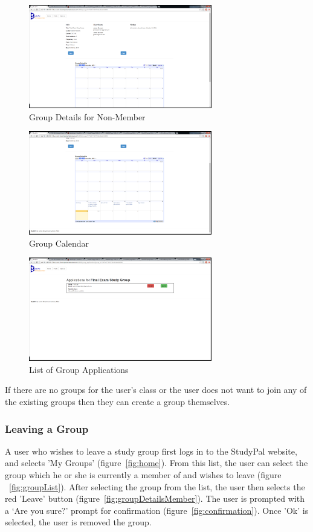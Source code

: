 \documentclass[conference]{IEEEtran}
\begin{document}
\begin{figure}[ht!]
\centering
\includegraphics[width=80mm]{figures/groupDetails}
\caption{Group Details for Non-Member \label{fig:groupDetails}}
\end{figure}

\begin{figure}[ht!]
\centering
\includegraphics[width=80mm]{figures/groupCalendar}
\caption{Group Calendar \label{fig:groupCalendar}}
\end{figure}

\begin{figure}[ht!]
\centering
\includegraphics[width=80mm]{figures/groupApplicationList}
\caption{List of Group Applications \label{fig:groupApplicationList}}
\end{figure}

If there are no groups for the user's class or the user does not want to join any of the existing groups then they can create a group themselves.

\subsubsection{Leaving a Group}
A user who wishes to leave a study group first logs in to the StudyPal website, and selects 'My Groups' (figure~\ref{fig:home}).  From this list, the user can select the group which he or she is currently a member of and wishes to leave (figure ~\ref{fig:groupList}).  After selecting the group from the list, the user then selects the red 'Leave' button (figure~\ref{fig:groupDetailsMember}).  The user is prompted with a `Are you sure?' prompt for confirmation (figure~\ref{fig:confirmation}).  Once 'Ok' is selected, the user is removed the group.
\end{document}
